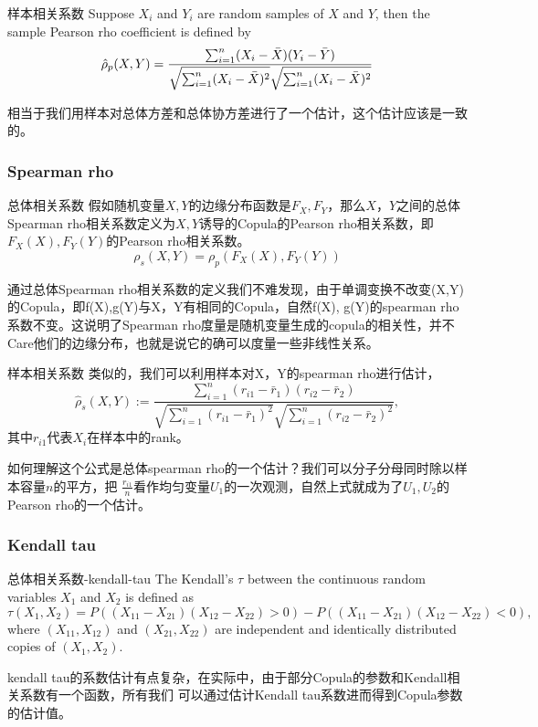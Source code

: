 \documentclass[12pt]{article}
\begin{document}
\begin{sdefinition}{样本相关系数}{}
Suppose $X_i$ and $Y_i$ are random samples of $X$ and $Y$, then the sample Pearson rho 
coefficient is defined by
$$
\hat \rho_p(X,Y) = \frac{{\sum_{i=1}^{n}}(X_i -\bar X)(Y_i -\bar Y)}{\sqrt{{\sum_{i=1}^{n}}(X_i-\bar X)^2}\sqrt{{\sum_{i=1}^{n}}(X_i-\bar X)^2}}
$$
\end{sdefinition}
\begin{sremark}{}{}
	相当于我们用样本对总体方差和总体协方差进行了一个估计，这个估计应该是一致的。
\end{sremark}

\subsubsection{Spearman rho}
\begin{sdefinition}{总体相关系数}{}
假如随机变量$X,Y$的边缘分布函数是$F_X, F_Y$，那么$X，Y$之间的总体Spearman rho相关系数定义为$X,Y$诱导的Copula的Pearson rho相关系数，即$F_X(X), F_Y(Y)$的Pearson rho相关系数。
$$
\rho_s(X,Y) = \rho_p (F_X(X),F_Y(Y))
$$
\end{sdefinition}
\begin{sremark}{}{}
	通过总体Spearman rho相关系数的定义我们不难发现，由于单调变换不改变(X,Y)的Copula，即f(X),g(Y)与X，Y有相同的Copula，自然f(X), g(Y)的spearman rho系数不变。这说明了Spearman rho度量是随机变量生成的copula的相关性，并不Care他们的边缘分布，也就是说它的确可以度量一些非线性关系。
\end{sremark}

\begin{sdefinition}{样本相关系数}{}
类似的，我们可以利用样本对X，Y的spearman rho进行估计，
$$
\hat{\rho}_s\left(X, Y\right):=\frac{\sum_{i=1}^n\left(r_{i 1}-\bar{r}_1\right)\left(r_{i 2}-\bar{r}_2\right)}{\sqrt{\sum_{i=1}^n\left(r_{i 1}-\bar{r}_1\right)^2} \sqrt{\sum_{i=1}^n\left(r_{i 2}-\bar{r}_2\right)^2}},
$$
其中$r_{i1}$代表$X_i$在样本中的rank。
\end{sdefinition}
\begin{sremark}{}{}
如何理解这个公式是总体spearman rho的一个估计？我们可以分子分母同时除以样本容量$n$的平方，把
$\frac{r_{i1}}{n}$看作均匀变量$U_1$的一次观测，自然上式就成为了$U_1,U_2$的Pearson rho的一个估计。	
\end{sremark}



\subsubsection{Kendall tau}
\begin{sdefinition}{总体相关系数-kendall-tau}{}
The Kendall's $\tau$ between the continuous random variables $X_1$ and $X_2$ is defined as
$$
\tau\left(X_1, X_2\right)=P\left(\left(X_{11}-X_{21}\right)\left(X_{12}-X_{22}\right)>0\right)-P\left(\left(X_{11}-X_{21}\right)\left(X_{12}-X_{22}\right)<0\right),
$$
where $\left(X_{11}, X_{12}\right)$ and $\left(X_{21}, X_{22}\right)$ are independent and identically distributed copies of $\left(X_1, X_2\right)$.
\end{sdefinition}
kendall tau的系数估计有点复杂，在实际中，由于部分Copula的参数和Kendall相关系数有一个函数，所有我们
可以通过估计Kendall tau系数进而得到Copula参数的估计值。
\end{document}
